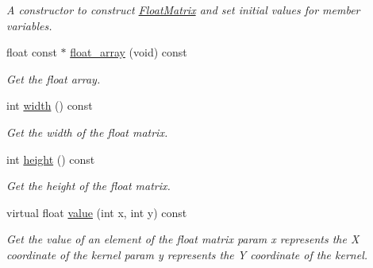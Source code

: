 \begin{DoxyCompactItemize}
\begin{DoxyCompactList}\small\item\em A constructor to construct \hyperlink{classimage__tools_1_1FloatMatrix}{Float\+Matrix} and set initial values for member variables. \end{DoxyCompactList}\item 
float const $\ast$ \hyperlink{classimage__tools_1_1FloatMatrix_aaa3e2ed3de0582b4411c5b48e524181e}{float\+\_\+array} (void) const 
\begin{DoxyCompactList}\small\item\em Get the float array. \end{DoxyCompactList}\item 
int \hyperlink{classimage__tools_1_1FloatMatrix_af4020870b09ec5b6bf90776e52fbc8b3}{width} () const 
\begin{DoxyCompactList}\small\item\em Get the width of the float matrix. \end{DoxyCompactList}\item 
int \hyperlink{classimage__tools_1_1FloatMatrix_aa053954b03eb71794f0e6eeeb0567f19}{height} () const 
\begin{DoxyCompactList}\small\item\em Get the height of the float matrix. \end{DoxyCompactList}\item 
virtual float \hyperlink{classimage__tools_1_1FloatMatrix_ab376dde20ee04b3ed91b033e92f8f5c7}{value} (int x, int y) const 
\begin{DoxyCompactList}\small\item\em Get the value of an element of the float matrix param x represents the X coordinate of the kernel param y represents the Y coordinate of the kernel. \end{DoxyCompactList}\end{DoxyCompactItemize}
